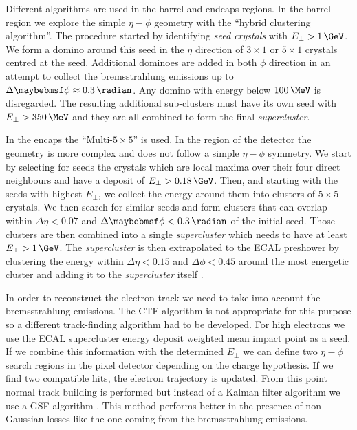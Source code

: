 Different algorithms are used in the barrel and endcaps regions. In the barrel region we explore the simple $\eta-\phi$ geometry with the ``hybrid clustering algorithm''. The procedure started by identifying \textit{seed crystals} with $E_\perp>1\,\GeV$. We form a domino around this seed in the $\eta$ direction of $3 \times 1$ or $5 \times 1$ crystals centred at the seed. Additional dominoes are added in both $\phi$ direction in an attempt to collect the bremsstrahlung emissions up to $\Delta\phi \approx 0.3\,\radian$. Any domino with energy below $100\,\MeV$ is disregarded. The resulting additional sub-clusters must have its own seed with $E_\perp>350\,\MeV$ and they are all combined to form the final \textit{supercluster}. 

In the encaps the ``$\text{Multi-}5 \times 5$'' is used. In the region of the detector the geometry is more complex and does not follow a simple $\eta-\phi$ symmetry. We start by selecting for seeds the crystals which are local maxima over their four direct neighbours and have a deposit of $E_\perp>0.18\,\GeV$. Then, and starting with the seeds with highest $E_\perp$, we collect the energy around them into clusters of $5 \times 5$ crystals. We then search for similar seeds and form clusters that can overlap within $\Delta\eta<0.07$ and $\Delta\phi<0.3\,\radian$ of the initial seed. Those clusters are then combined into a single \textit{supercluster} which needs to have at least $E_\perp>1\,\GeV$. The \textit{supercluster} is then extrapolated to the \gls{ECAL} preshower
by clustering the energy within $\Delta\eta<0.15$ and $\Delta\phi<0.45$ around the most energetic cluster and adding it to the \textit{supercluster} itself \cite{ARTICLE:CMSElectronReconstruction8TeV}.

In order to reconstruct the electron track we need to take into account the bremsstrahlung emissions. The \gls{CTF} algorithm is not appropriate for this purpose so a different track-finding algorithm had to be developed. For high \pt electrons we use the \gls{ECAL} supercluster energy deposit weighted mean impact point as a seed. If we combine this information with the determined $E_\perp$ we can define two $\eta-\phi$ search regions in the pixel detector depending on the charge hypothesis. If we find two compatible hits, the electron trajectory is updated. From this point normal track building is performed but instead of a Kalman filter algorithm we use a \gls{GSF} algorithm \cite{ARTICLE:CMSReconstructionElectronsGSF}. This method performs better in the presence of non-Gaussian losses like the one coming from the bremsstrahlung emissions.

